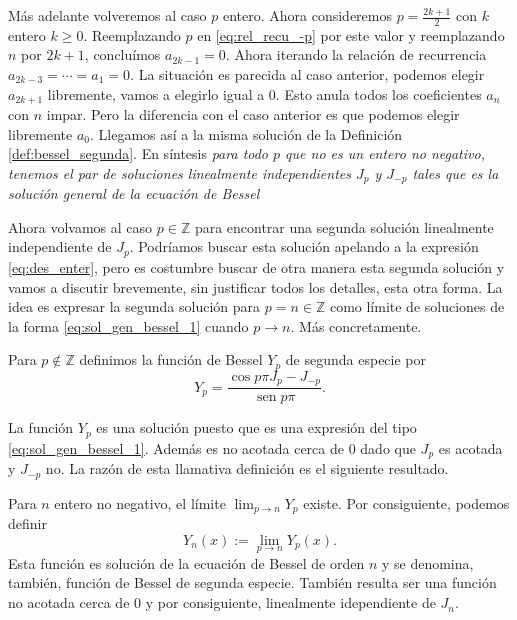 \documentclass{article}
\DeclareMathOperator{\sen}{sen}
\begin{document}
Más adelante volveremos al caso $p$ entero. Ahora consideremos $p=\frac{2k+1}{2}$ con $k$ entero $k\geq 0$.  Reemplazando $p$ en \eqref{eq:rel_recu_-p}  por este valor y reemplazando $n$ por $2k+1$, concluímos $a_{2k-1}=0$. Ahora iterando la relación de recurrencia $a_{2k-3}=\cdots=a_1=0$. La situación es parecida al caso anterior, podemos elegir $a_{2k+1}$ libremente, vamos a elegirlo igual a $0$. Esto anula todos los coeficientes $a_n$ con $n$ impar. Pero la diferencia con el caso anterior es que podemos elegir libremente $a_0$. Llegamos así a la misma solución de la Definición \ref{def:bessel_segunda}. En síntesis \emph{para todo $p$ que no es un entero no negativo, tenemos el par de soluciones linealmente independientes $J_p$ y $J_{-p}$ tales que
es la solución general de la ecuación de Bessel}

Ahora volvamos al caso $p\in\mathbb{Z}$ para encontrar una segunda solución  linealmente independiente de $J_p$. Podríamos buscar esta solución apelando a la expresión \eqref{eq:des_enter}, pero es costumbre buscar de otra manera esta segunda solución y vamos a discutir brevemente,  sin justificar todos los detalles,  esta otra forma. La idea es expresar la segunda solución para  $p=n\in\mathbb{Z}$ como límite de soluciones  de la forma  \eqref{eq:sol_gen_bessel_1} cuando $p\to n$. Más concretamente.

\begin{definicion} Para $p\notin\mathbb{Z}$ definimos la función de Bessel $Y_p$ de segunda especie por
\begin{equation}\label{eq:bessel_2_especie}
Y_p=\frac{\cos p\pi J_p-J_{-p}}{\sen p\pi}.
\end{equation}
\end{definicion}

La función $Y_p$ es una solución puesto que es una expresión del tipo \eqref{eq:sol_gen_bessel_1}. Además es no acotada cerca de $0$ dado que $J_p$ es acotada y $J_{-p}$ no. La razón de esta llamativa definición es el siguiente resultado. 

\begin{lema} Para $n$ entero no negativo,  el  límite $\lim_{p\to n}Y_p$ existe. Por consiguiente, podemos definir
\begin{equation}\label{eq:bessel_2_especie_b}
Y_n(x):=\lim_{p\to n}Y_p(x).
\end{equation}  
Esta función es solución de la ecuación de Bessel de orden $n$ y se denomina, también, función de Bessel de segunda especie. También resulta ser una función no acotada cerca de $0$ y por consiguiente, linealmente idependiente de $J_n$.
\end{lema}
\end{document}
